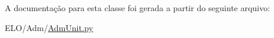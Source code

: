 A documentação para esta classe foi gerada a partir do seguinte arquivo\-:\begin{DoxyCompactItemize}
\item 
E\-L\-O/\-Adm/\hyperlink{AdmUnit_8py}{Adm\-Unit.\-py}\end{DoxyCompactItemize}
